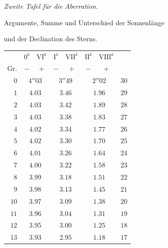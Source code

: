 \begin{center}
\textit{Zweite Tafel für die Aberration.}\par\medskip
Argumente, Summe und Unterschied der Sonnenlänge\par
und der Declination des Sterns.\par\medskip
\begingroup\small\setlength{\tabcolsep}{8pt}
\begin{tabular}{r||cc|cc|cc||r}
&$0^{\mathrm z}$&$\mathrm{VI}^{\mathrm z}$&$\mathrm I^{\mathrm z}$&$\mathrm{VII}^{\mathrm z}$&$\mathrm{II}^{\mathrm z}$&$\mathrm{VIII}^{\mathrm z}$&\\
Gr.&$-$&$+$&$-$&$+$&$-$&$+$&\\\hline
$0$&\multicolumn{2}{c|}{$4''03$}&\multicolumn{2}{c|}{$3''49$}&\multicolumn{2}{c||}{$2''02$}&$30$\\
$1$&\multicolumn{2}{c|}{$4.03$}&\multicolumn{2}{c|}{$3.46$}&\multicolumn{2}{c||}{$1.96$}&$29$\\
$2$&\multicolumn{2}{c|}{$4.03$}&\multicolumn{2}{c|}{$3.42$}&\multicolumn{2}{c||}{$1.89$}&$28$\\
$3$&\multicolumn{2}{c|}{$4.03$}&\multicolumn{2}{c|}{$3.38$}&\multicolumn{2}{c||}{$1.83$}&$27$\\
$4$&\multicolumn{2}{c|}{$4.02$}&\multicolumn{2}{c|}{$3.34$}&\multicolumn{2}{c||}{$1.77$}&$26$\\
$5$&\multicolumn{2}{c|}{$4.02$}&\multicolumn{2}{c|}{$3.30$}&\multicolumn{2}{c||}{$1.70$}&$25$\\
$6$&\multicolumn{2}{c|}{$4.01$}&\multicolumn{2}{c|}{$3.26$}&\multicolumn{2}{c||}{$1.64$}&$24$\\
$7$&\multicolumn{2}{c|}{$4.00$}&\multicolumn{2}{c|}{$3.22$}&\multicolumn{2}{c||}{$1.58$}&$23$\\
$8$&\multicolumn{2}{c|}{$3.99$}&\multicolumn{2}{c|}{$3.18$}&\multicolumn{2}{c||}{$1.51$}&$22$\\
$9$&\multicolumn{2}{c|}{$3.98$}&\multicolumn{2}{c|}{$3.13$}&\multicolumn{2}{c||}{$1.45$}&$21$\\
$10$&\multicolumn{2}{c|}{$3.97$}&\multicolumn{2}{c|}{$3.09$}&\multicolumn{2}{c||}{$1.38$}&$20$\\
$11$&\multicolumn{2}{c|}{$3.96$}&\multicolumn{2}{c|}{$3.04$}&\multicolumn{2}{c||}{$1.31$}&$19$\\
$12$&\multicolumn{2}{c|}{$3.95$}&\multicolumn{2}{c|}{$3.00$}&\multicolumn{2}{c||}{$1.25$}&$18$\\
$13$&\multicolumn{2}{c|}{$3.93$}&\multicolumn{2}{c|}{$2.95$}&\multicolumn{2}{c||}{$1.18$}&$17$\\

\end{tabular}
\end{center}
